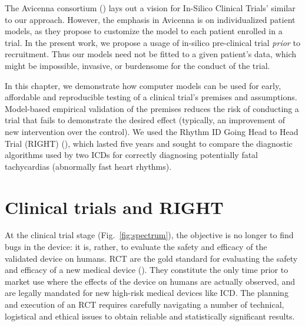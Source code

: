 The Avicenna consortium (\cite{Avicenna}) lays out a vision for In-Silico Clinical Trials' similar to our approach.
However, the emphasis in Avicenna is on individualized patient models, as they propose to customize the model to each patient enrolled in a trial.
In the present work, we propose a usage of in-silico pre-clinical trial \emph{prior} to recruitment.
Thus our models need not be fitted to a given patient's data, which might be impossible, invasive, or burdensome for the conduct of the trial.

In this chapter,
we demonstrate how  computer models can be used for early, affordable and reproducible testing of a clinical trial's premises and assumptions.
Model-based empirical validation of the premises reduces the risk of conducting a trial that fails to demonstrate the desired effect (typically, an improvement of new intervention over the control). 
We used the Rhythm ID Going Head to Head Trial (RIGHT) (\cite{GoldABBTB11_RIGHTresults}), which lasted five years and sought to compare the diagnostic algorithms used by two ICDs for correctly diagnosing potentially fatal tachycardias (abnormally fast heart rhythms).


\section{Clinical trials and RIGHT}
\label{sec:rcts}

At the clinical trial stage (Fig.~\ref{fig:spectrum}), the objective is no longer to find bugs in the device: it is, rather, to evaluate the safety and efficacy of the validated device on humans. 
RCT are the gold standard for evaluating the safety and efficacy of a new medical device (\cite{FriedmanFD10_ClinicalTrials}).
They constitute the only time prior to market use where the effects of the device on humans are actually observed, and are legally mandated for new high-risk medical devices like ICD.
The planning and execution of an RCT requires carefully navigating a number of technical, logistical and ethical issues to obtain reliable and statistically significant results.


